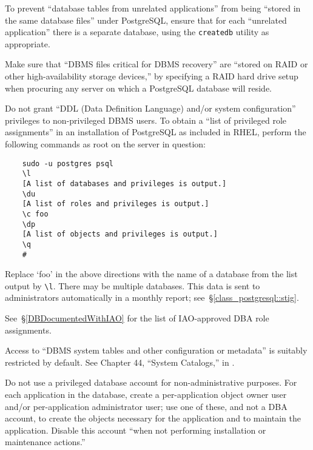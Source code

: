 %
To prevent ``database tables from unrelated applications'' from being
``stored in the same database files'' under PostgreSQL, ensure that for
each ``unrelated application'' there is a separate database, using the
\verb!createdb! utility as appropriate.

%
Make sure that ``DBMS files critical for DBMS recovery'' are ``stored on
RAID or other high-availability storage devices,'' by specifying a RAID
hard drive setup when procuring any server on which a PostgreSQL database
will reside.

%
Do not grant ``DDL (Data Definition Language) and/or system
configuration'' privileges to non-privileged DBMS users. To obtain a
``list of privileged role assignments'' in an installation of PostgreSQL
as included in RHEL, perform the following commands as root on the server
in question:

\begin{verbatim}
    sudo -u postgres psql
    \l
    [A list of databases and privileges is output.]
    \du
    [A list of roles and privileges is output.]
    \c foo
    \dp
    [A list of objects and privileges is output.]
    \q
    #
\end{verbatim}

Replace `foo' in the above directions with the name of a database from the
list output by \verb!\l!. There may be multiple databases. This data is
sent to administrators automatically in a monthly report;
see~\S\ref{class_postgresql::stig}. 

See~\S\ref{DBDocumentedWithIAO} for the list of IAO-approved DBA role
assignments.


%
Access to ``DBMS system tables and other configuration or metadata'' is
suitably restricted by default. See Chapter 44, ``System Catalogs,'' in
\cite{pgsql-documentation}.

%
Do not use a privileged database account for non-administrative purposes.
For each application in the database, create a per-application object
owner user and/or per-application administrator user; use one of these,
and not a DBA account, to create the objects necessary for the application
and to maintain the application. Disable this account ``when not
performing installation or maintenance actions.''

